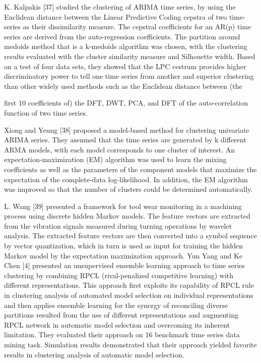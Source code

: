 K.  Kalpakis    [37]  studied  the  clustering  of  ARIMA  time series, by using the Euclidean distance between the Linear Predictive Coding cepstra of two time-series as their dissimilarity measure. The cepstral coefficients for an AR(p) time series are derived from the auto-regression coefficients. The partition around medoids method that is a k-medoids algorithm was chosen, with the clustering results evaluated with  the  cluster  similarity  measure  and  Silhouette  width. Based on a test of four data sets, they showed that the LPC cestrum provides higher discriminatory power to tell one time series from another and superior clustering than other widely used methods such as the Euclidean distance between (the
 
first 10 coefficients of) the DFT, DWT, PCA, and DFT of the auto-correlation function of two time series.

Xiong and Yeung [38] proposed a model-based method for clustering univariate ARIMA series. They assumed that the time series are generated by k different ARMA models, with each model corresponds to one cluster of interest. An expectation-maximization (EM) algorithm was used to learn the mixing coefficients as well as the parameters of the component models that maximize the expectation of the complete-data log-likelihood. In addition, the EM algorithm was improved so that the number of clusters could be determined automatically.

L. Wang [39] presented a framework for tool wear monitoring in a machining process using discrete hidden Markov models. The feature vectors are extracted from the vibration signals measured during turning operations by wavelet analysis. The extracted  feature vectors are then  converted into a symbol sequence  by vector  quantization,  which  in  turn  is used  as input for training the hidden Markov model by the expectation maximization approach. Yun Yang and Ke Chen [4] presented an unsupervised ensemble learning approach to time series clustering by combining RPCL (rival-penalized competitive learning) with different representations. This approach first exploits its capability of RPCL rule in clustering analysis of automated model selection on individual representations and then applies ensemble learning for the synergy of reconciling diverse partitions resulted from the use of different representations and augmenting RPCL network in automatic model selection and overcoming its inherent limitation. They evaluated their approach on 16 benchmark time series data mining task. Simulation results demonstrated that their approach yielded favorite results in clustering analysis of automatic model selection.

